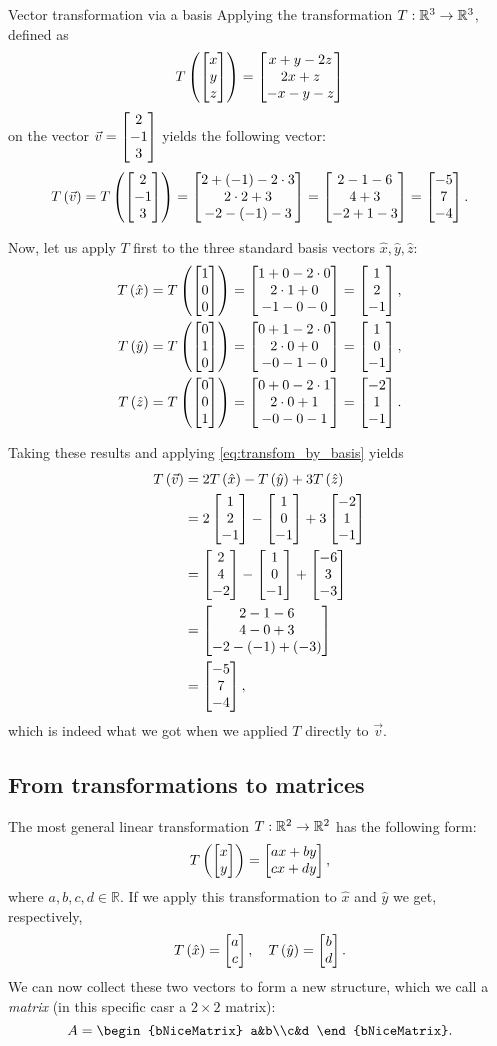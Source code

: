 \begin{example}{Vector transformation via a basis}{}
	Applying the transformation $T:\mathbb{R}^{3}\to\mathbb{R}^{3}$, defined as
	\[
		T\left(\colvec{x;y;z}\right)=\colvec{x+y-2z;2x+z;-x-y-z}
	\]
	on the vector $\vec{v}=\colvec{2;-1;3}$ yields the following vector:
	\[
		T\left(\vec{v}\right) = T\left(\colvec{2;-1;3}\right) = \colvec{2+(-1)-2\cdot3;2\cdot2+3;-2-(-1)-3} = \colvec{2-1-6;4+3;-2+1-3} = \colvec{-5;7;-4}.
	\]

	Now, let us apply $T$ first to the three standard basis vectors $\hat{x},\hat{y},\hat{z}$:
	\begin{align*}
		T\left( \hat{x} \right) &= T\left(\colvec{1;0;0}\right) = \colvec{1+0-2\cdot0;2\cdot1+0;-1-0-0} = \colvec{1;2;-1},\\
		T\left( \hat{y} \right) &= T\left(\colvec{0;1;0}\right) = \colvec{0+1-2\cdot0;2\cdot0+0;-0-1-0} = \colvec{1;0;-1},\\
		T\left( \hat{z} \right) &= T\left(\colvec{0;0;1}\right) = \colvec{0+0-2\cdot1;2\cdot0+1;-0-0-1} = \colvec{-2;1;-1}.
	\end{align*}

	Taking these results and applying \autoref{eq:transfom_by_basis} yields
	\begin{align*}
		T\left( \vec{v} \right) &= 2T \left( \hat{x} \right) -T \left( \hat{y} \right) + 3T \left( \hat{z} \right)\\
								&= 2\colvec{1;2;-1} - \colvec{1;0;-1} + 3\colvec{-2;1;-1}\\
								&= \colvec{2;4;-2} - \colvec{1;0;-1} + \colvec{-6;3;-3}\\
								&= \colvec{2-1-6;4-0+3;-2-(-1)+(-3)}\\
								&= \colvec{-5;7;-4},
	\end{align*}
	which is indeed what we got when we applied $T$ directly to $\vec{v}$.
\end{example}

\subsection{From transformations to matrices}
The most general linear transformation $T:\mathbb{R}^{2}\to\mathbb{R}^{2}$ has the following form:
\begin{equation}
	T \left( \colvec{x;y} \right) = \colvec{ax+by;cx+dy},
	\label{eq:generic_R2_LT}
\end{equation}
where $a,b,c,d\in\mathbb{R}$. If we apply this transformation to $\hat{x}$ and $\hat{y}$ we get, respectively,
\begin{equation}
	T \left( \hat{x} \right) = \colvec{a;c},\quad T \left( \hat{y} \right) = \colvec{b;d}.
	\label{eq:}
\end{equation}
We can now collect these two vectors to form a new structure, which we call a \emph{matrix} (in this specific casr a $2\times2$ matrix):
\begin{equation}
	A = \begin{bNiceMatrix} a&b\\c&d \end{bNiceMatrix}.
	\label{eq:matrix}
\end{equation}

